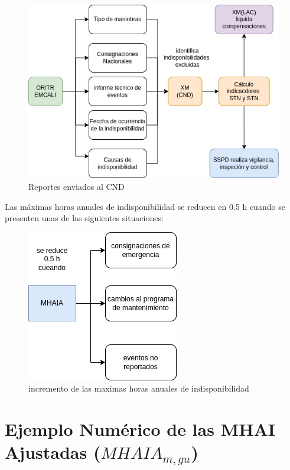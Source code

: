 \documentclass[a5paper]{book}%
\begin{document}
\begin{figure}[H]
  \centering
  \caption{Reportes enviados al CND}
  \label{fig:reportes_transmision}
  \includegraphics[width=\linewidth ]{reportes_transmision}
\end{figure}
  
   Las máximas horas anuales de indisponibilidad  se reducen en 0.5 h cuando se presenten unas de las siguientes situaciones:
  
  \begin{figure}[H]
    \centering
    \caption{incremento de las maximas horas anuales de indisponibilidad}
    \label{fig:mhaia}
    \includegraphics[width=0.6\linewidth]{MHAIA}
  \end{figure}

  
\section*{Ejemplo Numérico de las MHAI Ajustadas ($MHAI A_{m, gu}$)}
\end{document}
